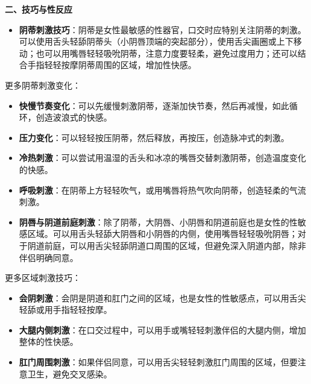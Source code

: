 \documentclass[12pt,UTF8]{ctexbook}
\begin{document}
  \textbf{二、技巧与性反应}
  \begin{itemize}
  \item \textbf{阴蒂刺激技巧}：阴蒂是女性最敏感的性器官，口交时应特别关注阴蒂的刺激。可以使用舌头轻舔阴蒂头（小阴唇顶端的突起部分），使用舌尖画圈或上下移动；也可以用嘴唇轻轻吸吮阴蒂，注意力度要轻柔，避免过度用力；还可以结合手指轻轻按摩阴蒂周围的区域，增加性快感。\par
  \end{itemize}
    更多阴蒂刺激变化：
    \begin{itemize}
    \item \textbf{快慢节奏变化}：可以先缓慢刺激阴蒂，逐渐加快节奏，然后再减慢，如此循环，创造波浪式的快感。
    \item \textbf{压力变化}：可以轻轻按压阴蒂，然后释放，再按压，创造脉冲式的刺激。
    \item \textbf{冷热刺激}：可以尝试用温湿的舌头和冰凉的嘴唇交替刺激阴蒂，创造温度变化的快感。
    \item \textbf{呼吸刺激}：在阴蒂上方轻轻吹气，或用嘴唇将热气吹向阴蒂，创造轻柔的气流刺激。
    \end{itemize}
  \begin{itemize}
  \item \textbf{阴唇与阴道前庭刺激}：除了阴蒂，大阴唇、小阴唇和阴道前庭也是女性的性敏感区域。可以用舌头轻舔大阴唇和小阴唇的内侧，使用嘴唇轻轻吸吮阴唇；对于阴道前庭，可以用舌尖轻舔阴道口周围的区域，但避免深入阴道内部，除非伴侣明确同意。\par
  \end{itemize}
    更多区域刺激技巧：
    \begin{itemize}
    \item \textbf{会阴刺激}：会阴是阴道和肛门之间的区域，也是女性的性敏感点，可以用舌尖轻舔或用手指轻轻按摩。
    \item \textbf{大腿内侧刺激}：在口交过程中，可以用手或嘴轻轻刺激伴侣的大腿内侧，增加整体的性快感。
    \item \textbf{肛门周围刺激}：如果伴侣同意，可以用舌尖轻轻刺激肛门周围的区域，但要注意卫生，避免交叉感染。
    \end{itemize}
\end{document}
